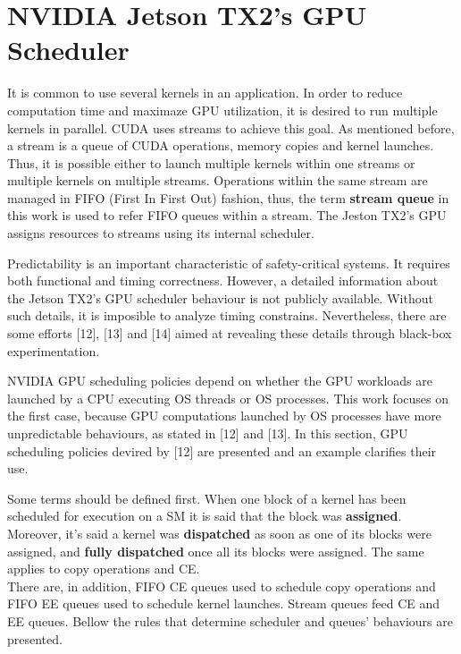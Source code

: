 \documentclass[
  12pt,
  a4paperpaper,
]{report}
\begin{document}
\hypertarget{nvidia-jetson-tx2s-gpu-scheduler}{%
\section{NVIDIA Jetson TX2's GPU
Scheduler}\label{nvidia-jetson-tx2s-gpu-scheduler}}

It is common to use several kernels in an application. In order to reduce
computation time and maximaze GPU utilization, it is desired to run
multiple kernels in parallel. CUDA uses streams to achieve this goal. As
mentioned before, a stream is a queue of CUDA operations, memory copies
and kernel launches. Thus, it is possible either to launch multiple
kernels within one streams or multiple kernels on multiple streams.
Operations within the same stream are managed in FIFO (First In First
Out) fashion, thus,  the term \textbf{stream queue} in this work is used to refer FIFO queues within a stream. 
The Jeston TX2's GPU assigns resources to streams using its internal scheduler.

Predictability is an important characteristic of safety-critical
systems. It requires both functional and timing correctness. However, a
detailed information about the Jetson TX2's GPU scheduler behaviour is
not publicly available. Without such details, it is imposible to analyze
timing constrains. Nevertheless, there are some efforts {[}12{]},
{[}13{]} and {[}14{]} aimed at revealing these details through black-box
experimentation.

NVIDIA GPU scheduling policies depend on whether the GPU workloads are
launched by a CPU executing OS threads or OS processes. This work focuses on
the first case, because GPU computations launched by OS processes have
more unpredictable behaviours, as stated in {[}12{]} and {[}13{]}. In
this section, GPU scheduling policies devired by
{[}12{]} are presented and an example clarifies their use.

Some terms should be defined first. When one block of a kernel has been
scheduled for execution on a SM it is said that the block was
\textbf{assigned}. Moreover, it's said a kernel was \textbf{dispatched}
as soon as one of its blocks were assigned, and \textbf{fully
dispatched} once all its blocks were assigned. The same applies to copy
operations and CE.\\
There are, in addition, FIFO CE queues used to schedule copy operations
and FIFO EE queues used to schedule kernel launches. Stream queues feed
CE and EE queues. Bellow  the rules that determine scheduler and queues' behaviours are presented.
\end{document}
